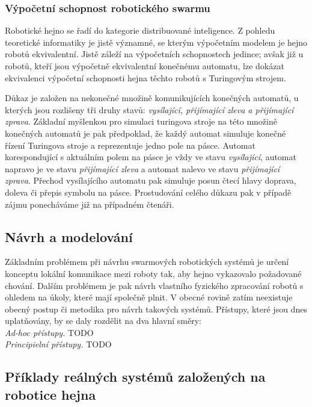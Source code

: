 \documentclass[a4paper,12pt]{article}
\begin{document}
\subsubsection{Výpočetní schopnost robotického swarmu}
Robotické hejno se řadí do kategorie distribuované inteligence. Z pohledu teoretické
informatiky je jistě významné, se kterým výpočetním modelem je hejno robotů ekvivalentní.
Jistě záleží na výpočetních schopnostech jedince; avšak již u robotů, kteří jsou výpočetně
ekvivalentní konečnému automatu, lze dokázat ekvivalenci výpočetní schopnosti hejna těchto
robotů s Turingovým strojem.

Důkaz je založen na nekonečné množině komunikujících konečných automatů, u kterých jsou
rozlišeny tři druhy stavů: {\it vysílající, přijímající zleva a přijímající zprava}.
Základní myšlenkou pro simulaci turingova stroje na této množině konečných automatů je
pak předpoklad, že každý automat simuluje konečné řízení Turingova stroje a reprezentuje
jedno pole na pásce. Automat korespondující s aktuálním polem na pásce je vždy ve stavu
{\it vysílající}, automat napravo je ve stavu {\it přijímající zleva} a automat
nalevo ve stavu {\it přijímající zprava}. Přechod vysílajícího automatu pak simuluje
posun čtecí hlavy doprava, doleva či přepis symbolu na pásce. Prostudování celého důkazu
pak v případě zájmu ponecháváme již na případném čtenáři. \cite{Dudek93}


\subsection{Návrh a modelování}
Základním problémem při návrhu swarmových robotických systémů je určení konceptu
lokální komunikace mezi roboty tak, aby hejno vykazovalo požadované chování. Dalším
problémem je pak návrh vlastního fyzického zpracování robotů s ohledem na úkoly, které
mají společně plnit. V obecné rovině zatím neexistuje obecný postup či metodika pro návrh
takových systémů. Přístupy, které jsou dnes uplatňovány, by se daly rozdělit na dva
hlavní směry:\\
{\it Ad-hoc přístupy.} TODO \\
{\it Principielní přístupy.} TODO \\


\subsection{Příklady reálných systémů založených na robotice hejna}
\end{document}
